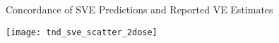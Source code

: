 \documentclass{beamer}
\begin{document}






\begin{frame}[c]{Concordance of SVE Predictions and Reported VE Estimates}

\hspace*{-0.5cm}\texttt{[image: tnd\_sve\_scatter\_2dose]}

\note{
}

\end{frame}


\end{document}
